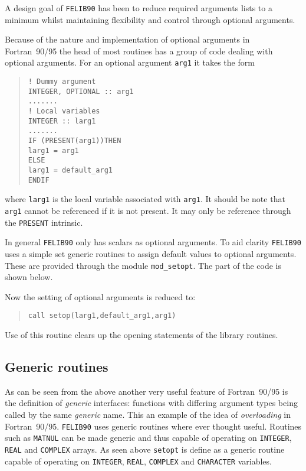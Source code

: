 \documentclass[a4paper,titlepage,11pt]{article}
\begin{document}
A design goal of {\tt FELIB90} has been to reduce required arguments lists to a minimum
whilst maintaining flexibility and control through optional arguments.

Because of the nature and implementation of optional arguments in Fortran~90/95 the
head of most routines has a group of code dealing with optional arguments. For an
optional argument {\tt arg1} it takes the form
\begin{quote}
\source
\begin{verbatim}
! Dummy argument
INTEGER, OPTIONAL :: arg1
.......
! Local variables
INTEGER :: larg1
.......
IF (PRESENT(arg1))THEN
larg1 = arg1
ELSE
larg1 = default_arg1
ENDIF
\end{verbatim}
\end{quote}
where {\tt larg1} is the local variable associated with {\tt arg1}. It should
be note that {\tt arg1} cannot be referenced if it is not present. It may only
be reference through the {\tt PRESENT} intrinsic.

In general {\tt FELIB90} only has scalars as optional arguments. 
To aid clarity {\tt FELIB90} uses a simple set generic routines to assign default values to
optional arguments. These are provided through the module {\tt mod\_setopt}. The part
of the code is shown below.
\begin{quote}
\source

\end{quote}
Now the setting of optional arguments is reduced to:
\begin{quote}
\source
\begin{verbatim}
call setop(larg1,default_arg1,arg1)
\end{verbatim}
\end{quote}
Use of this routine clears up the opening statements of the library routines.
%
\subsection{Generic routines}
As can be seen from the above another very useful feature of Fortran~90/95 is the definition 
of {\it generic} interfaces: functions with differing argument types being called by
the same {\it generic} name. This an example of the idea of 
{\it overloading} in Fortran~90/95. {\tt FELIB90} uses generic routines where ever thought useful.
Routines such as {\tt MATNUL} can be made generic and thus capable of operating on
{\tt INTEGER}, {\tt REAL} and {\tt COMPLEX} arrays. As seen above {\tt setopt} is define as a generic
routine capable of operating on {\tt INTEGER}, {\tt REAL}, {\tt COMPLEX} and {\tt CHARACTER} variables. 
\end{document}

